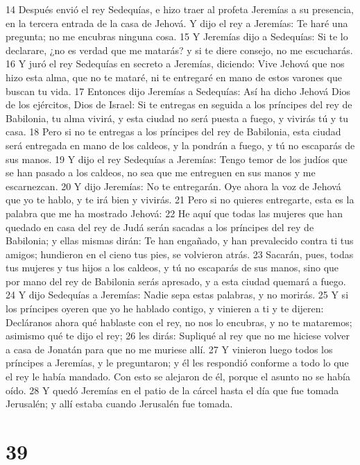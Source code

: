 14 Después envió el rey Sedequías, e hizo traer al profeta Jeremías a su presencia, en la tercera entrada de la casa de Jehová. Y dijo el rey a Jeremías: Te haré una pregunta; no me encubras ninguna cosa.
15 Y Jeremías dijo a Sedequías: Si te lo declarare, ¿no es verdad que me matarás? y si te diere consejo, no me escucharás.
16 Y juró el rey Sedequías en secreto a Jeremías, diciendo: Vive Jehová que nos hizo esta alma, que no te mataré, ni te entregaré en mano de estos varones que buscan tu vida.
17 Entonces dijo Jeremías a Sedequías: Así ha dicho Jehová Dios de los ejércitos, Dios de Israel: Si te entregas en seguida a los príncipes del rey de Babilonia, tu alma vivirá, y esta ciudad no será puesta a fuego, y vivirás tú y tu casa.
18 Pero si no te entregas a los príncipes del rey de Babilonia, esta ciudad será entregada en mano de los caldeos, y la pondrán a fuego, y tú no escaparás de sus manos.
19 Y dijo el rey Sedequías a Jeremías: Tengo temor de los judíos que se han pasado a los caldeos, no sea que me entreguen en sus manos y me escarnezcan.
20 Y dijo Jeremías: No te entregarán. Oye ahora la voz de Jehová que yo te hablo, y te irá bien y vivirás.
21 Pero si no quieres entregarte, esta es la palabra que me ha mostrado Jehová:
22 He aquí que todas las mujeres que han quedado en casa del rey de Judá serán sacadas a los príncipes del rey de Babilonia; y ellas mismas dirán: Te han engañado, y han prevalecido contra ti tus amigos; hundieron en el cieno tus pies, se volvieron atrás.
23 Sacarán, pues, todas tus mujeres y tus hijos a los caldeos, y tú no escaparás de sus manos, sino que por mano del rey de Babilonia serás apresado, y a esta ciudad quemará a fuego.
24 Y dijo Sedequías a Jeremías: Nadie sepa estas palabras, y no morirás.
25 Y si los príncipes oyeren que yo he hablado contigo, y vinieren a ti y te dijeren: Decláranos ahora qué hablaste con el rey, no nos lo encubras, y no te mataremos; asimismo qué te dijo el rey;
26 les dirás: Supliqué al rey que no me hiciese volver a casa de Jonatán para que no me muriese allí.
27 Y vinieron luego todos los príncipes a Jeremías, y le preguntaron; y él les respondió conforme a todo lo que el rey le había mandado. Con esto se alejaron de él, porque el asunto no se había oído.
28 Y quedó Jeremías en el patio de la cárcel hasta el día que fue tomada Jerusalén; y allí estaba cuando Jerusalén fue tomada. 

\chapter{39}

